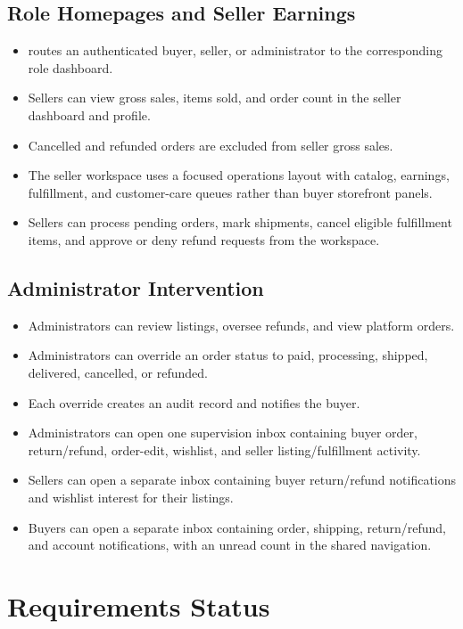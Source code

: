 \documentclass[11pt]{scrreprt}
\newcommand{\code}[1]{\texttt{\detokenize{#1}}}
\begin{document}
\section{Role Homepages and Seller Earnings}
\begin{itemize}
\item \code{/home} routes an authenticated buyer, seller, or administrator to
the corresponding role dashboard.
\item Sellers can view gross sales, items sold, and order count in the seller
dashboard and profile.
\item Cancelled and refunded orders are excluded from seller gross sales.
\item The seller workspace uses a focused operations layout with catalog,
earnings, fulfillment, and customer-care queues rather than buyer storefront
panels.
\item Sellers can process pending orders, mark shipments, cancel eligible
fulfillment items, and approve or deny refund requests from the workspace.
\end{itemize}

\section{Administrator Intervention}
\begin{itemize}
\item Administrators can review listings, oversee refunds, and view platform
orders.
\item Administrators can override an order status to paid, processing,
shipped, delivered, cancelled, or refunded.
\item Each override creates an \code{admin_actions} audit record and notifies
the buyer.
\item Administrators can open one supervision inbox containing buyer order,
return/refund, order-edit, wishlist, and seller listing/fulfillment activity.
\item Sellers can open a separate inbox containing buyer return/refund notifications and
wishlist interest for their listings.
\item Buyers can open a separate inbox containing order, shipping, return/refund, and
account notifications, with an unread count in the shared navigation.
\end{itemize}

\chapter{Requirements Status}
\end{document}
